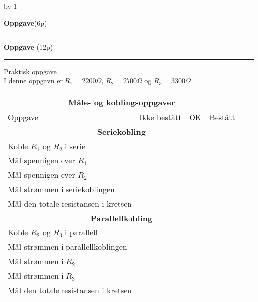 \documentclass[12pt,a4paper]{article}
\def\oppgave{
            \advance\questnum by 1
	    \ifthenelse{\questnum>0\AND \questnum<9}
	    {
                \vskip 1cm
		\textbf{Oppgave}\hskip 5pt\the\questnum \hfill \hfill(6p)
		\vskip 3pt
		\hrule
	\vskip 0.5cm}
	{
                \vskip 1cm
		\textbf{Oppgave}\hskip 5pt \the\questnum \hfill \hfill(12p)
		\vskip 3pt \hrule \vskip 0.5cm }

		}
\begin{document}
\vskip 2.5pt 
\newpage
\oppgave{}%
\vskip 2.5pt 
Praktisk oppgave \\
I denne oppgavn er $R_1=2200\Omega$, $R_2=2700\Omega$ og $R_3=3300\Omega$
	\Large
\begin{center}
	\begin{tabular}{| m{10.2cm} |m{1.5cm} |m{1.5cm} |m{1.5cm} |} 
\hline
	\multicolumn{4}{|c|}{\textbf{\cellcolor[HTML]{D5D5D5}Måle- og koblingsoppgaver}} \\
\hline
\hline
\rowcolor [HTML]{D5D5D5}
Oppgave	&Ikke bestått&OK&Bestått\\ \hline

	\multicolumn{4}{|c|}{\textbf{\cellcolor[HTML]{D5D5D5}Seriekobling}} \\
\hline
		Koble $R_1$ og $R_2$ i serie&&&\\ \cline{1-4}
		Mål spennigen over $R_1$&&&\\ \cline{1-4}
		Mål spennigen over $R_2$&&&\\ \cline{1-4}
		Mål strømmen i seriekoblingen &&&\\ \cline{1-4}
		Mål den totale resistansen i kretsen&&&\\ \cline{1-4}
	\multicolumn{4}{|c|}{\textbf{\cellcolor[HTML]{D5D5D5}Parallellkobling}} \\
		Koble $R_2$ og $R_3$ i parallell&&&\\ \cline{1-4}
		Mål strømmen i parallellkoblingen &&&\\ \cline{1-4}
		Mål strømmen i $R_2$&&&\\ \cline{1-4}
		Mål strømmen i $R_3$&&&\\ \cline{1-4}
		Mål den totale resistansen i kretsen&&&\\ \cline{1-4}
\end{tabular}
\end{center}
\vskip 2.5pt 
\newpage
\end{document}
